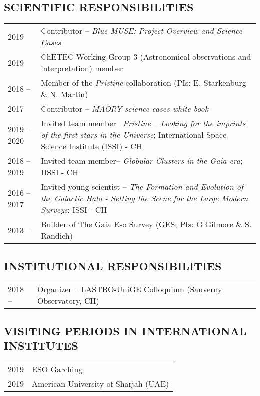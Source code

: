 \documentclass[ 11pt]{article}
\begin{document}
\subsection*{SCIENTIFIC RESPONSIBILITIES}
\begin{tabular}{p{2.5cm}p{13.5cm}}
2019     & Contributor -- {\em Blue MUSE: Project Overview and Science Cases}\\
2019      & ChETEC Working Group 3 (Astronomical observations and interpretation) member\\ 
2018 --  & Member of the {\em Pristine} collaboration (PIs: E. Starkenburg \& N. Martin)\\
2017     &  Contributor -- {\em MAORY science cases white book}\\
2019 -- 2020 &Invited team member-- {\em Pristine -- Looking for the imprints of the first stars in the Universe}; International Space Science Institute (ISSI) - CH \\
2018 -- 2019 & Invited team member-- {\em Globular Clusters in the Gaia era}; IISSI - CH\\
2016 -- 2017 & Invited young scientist -- {\em The Formation and Evolution of the Galactic Halo - Setting the Scene for the Large Modern Surveys}; ISSI - CH\\
2013 --         &   Builder of The Gaia Eso Survey (GES; PIs: G Gilmore \& S. Randich)\\

\end{tabular}


\subsection*{INSTITUTIONAL RESPONSIBILITIES}
\begin{tabular}{p{2.5cm}p{13.5cm}}
2018 --          & Organizer  -- LASTRO-UniGE Colloquium (Sauverny Observatory, CH)\\
\end{tabular}

\subsection*{VISITING PERIODS IN INTERNATIONAL INSTITUTES}
\begin{tabular}{p{2.5cm}p{13.5cm}}
2019           & ESO Garching\\
2019          & American University of Sharjah (UAE)\\
\end{tabular}
\end{document}
